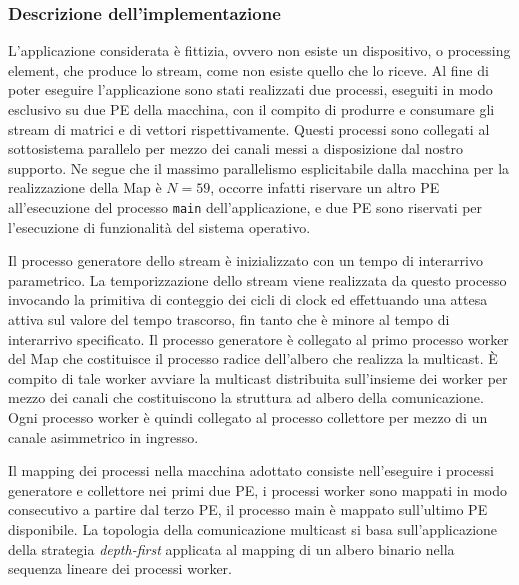 \subsubsection{Descrizione dell'implementazione}
L'applicazione considerata \`e fittizia, ovvero non esiste un dispositivo, o processing element, che produce lo stream, come non esiste quello che lo riceve. Al fine di poter eseguire l'applicazione sono stati realizzati due processi, eseguiti in modo esclusivo su due PE della macchina, con il compito di produrre e consumare gli stream di matrici e di vettori rispettivamente. Questi processi sono collegati al sottosistema parallelo per mezzo dei canali messi a disposizione dal nostro supporto. Ne segue che il massimo parallelismo esplicitabile dalla macchina per la realizzazione della Map \`e $N = 59$, occorre infatti riservare un altro PE all'esecuzione del processo \verb+main+ dell'applicazione, e due PE sono riservati per l'esecuzione di funzionalit\`a del sistema operativo.

Il processo generatore dello stream \`e inizializzato con un tempo di interarrivo parametrico. La temporizzazione dello stream viene realizzata da questo processo invocando la primitiva di conteggio dei cicli di clock ed effettuando una attesa attiva sul valore del tempo trascorso, fin tanto che \`e minore al tempo di interarrivo specificato. Il processo generatore \`e collegato al primo processo worker del Map che costituisce il processo radice dell'albero che realizza la multicast. \`E compito di tale worker avviare la multicast distribuita sull'insieme dei worker per mezzo dei canali che costituiscono la struttura ad albero della comunicazione. Ogni processo worker \`e quindi collegato al processo collettore per mezzo di un canale asimmetrico in ingresso.

Il mapping dei processi nella macchina adottato consiste nell'eseguire i processi generatore e collettore nei primi due PE, i processi worker sono mappati in modo consecutivo a partire dal terzo PE, il processo main \`e mappato sull'ultimo PE disponibile. La topologia della comunicazione multicast si basa sull'applicazione della strategia \emph{depth-first} applicata al mapping di un albero binario nella sequenza lineare dei processi worker. 

